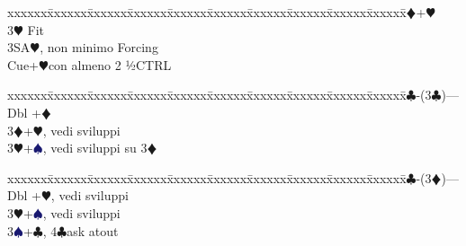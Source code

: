 \documentclass[a4paper,italian]{article}
\newcommand{\BC}{\textcolor{OliveGreen}{$\clubsuit$}}
\newcommand{\BD}{\textcolor{RedOrange}{$\vardiamondsuit$}}
\newcommand{\BH}{\textcolor{Red2}{$\varheartsuit${}}}
\newcommand{\BS}{\textcolor{MidnightBlue}{$\spadesuit${}}}
\newenvironment{bidtable}
{\begin{tabbing}

    xxxxxx\=xxxxxx\=xxxxxx\=xxxxxx\=xxxxxx\=xxxxxx\=xxxxxx\=xxxxxx\=xxxxxx\=xxxxxx\=\kill}
{\end{tabbing} }%
\begin{document}
\begin{multicols}{2}
\begin{bidtable}
                                        3\BD {}+\BH\+\\
                                            3\BH\> Fit\+\\
                                                3SA\BH, non minimo Forcing\\
                                                Cue+\BH con almeno 2 ½CTRL\-\-\\
                                    \end{bidtable}
                                    \begin{bidtable}
                                        2\BC-(3\BC)---\\
                                        Dbl +\BD\\
                                        3\BD {}+\BH, vedi sviluppi\\
                                        3\BH {}+\BS, vedi sviluppi su 3\BD\\
                                    \end{bidtable}
                                    \begin{bidtable}
                                        2\BC-(3\BD)---\\
                                        Dbl +\BH, vedi sviluppi\\
                                        3\BH {}+\BS, vedi sviluppi\\
                                        3\BS {}+\BC, 4\BC ask atout
                                    \end{bidtable}
                                    \end{multicols}
                                    \newpage
\end{document}

